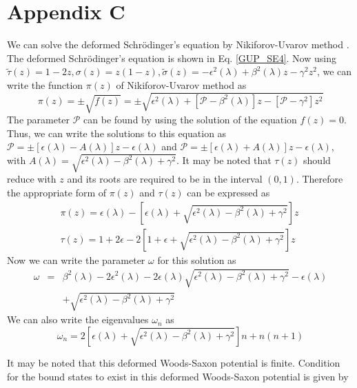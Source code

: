 \documentclass[12pt]{article}
\begin{document}
\section*{Appendix C}
We can solve the  deformed Schr\"{o}dinger's equation   by   Nikiforov-Uvarov method \cite{nu12, nu14}.  The deformed  Schr\"{o}dinger's equation is shown in Eq. \eqref{GUP_SE4}.
Now using  $
	\tilde{\tau}(z) = 1-2z, \sigma(z) = z(1-z),  \tilde{\sigma}(z) = -\epsilon^2(\lambda) + \beta^2(\lambda) z  - \gamma^2 z^2 $, we can write 
the  function $\pi(z)$ of   Nikiforov-Uvarov method as \cite{nu12, nu14} 
\begin{equation}
	\pi(z) =\pm \sqrt{f(z)} = \pm \sqrt{\epsilon^2(\lambda)  + [\mathcal{P} - \beta^2(\lambda)]z  - [\mathcal{P} - \gamma^2]z^2} 
\end{equation}
The parameter $\mathcal{P}$ can be found by using the solution of the equation  $f(z) =0$. 
Thus, we can write the  solutions to this equation as $	 \mathcal{P} =  \pm [ \epsilon(\lambda) -  A(\lambda)] z - \epsilon(\lambda)$ and  $	\mathcal{P} =   \pm [ \epsilon(\lambda) + A(\lambda)  ] z - \epsilon(\lambda)$, with $A(\lambda) = \sqrt{\epsilon^2 (\lambda)- \beta^2(\lambda) +\gamma^2} $. 
It may be noted that  $\tau(z)$ should reduce with $z$  and its roots are required to be in the interval $(0,1)$. Therefore the appropriate form  of $\pi(z)$ and $\tau(z)$ can be expressed as 
\begin{align}
\pi(z)=\epsilon(\lambda)-\left[\epsilon(\lambda)+\sqrt{\epsilon^2(\lambda)-\beta^2(\lambda)+\gamma^2}\right]z ~\label{pi_sol}
\\
\tau(z)=1+2\epsilon-2\left[1+\epsilon+\sqrt{\epsilon^2(\lambda)-\beta^2(\lambda)+\gamma^2}\right]z  ~\label{tau_sol}
\end{align}
Now  we can write the parameter $\omega$ for this solution as   
\begin{eqnarray}\label{omega_sol}
	\omega &=&\beta^2(\lambda)-2\epsilon^2(\lambda)-2\epsilon(\lambda)\sqrt{\epsilon^2(\lambda)-\beta^2(\lambda)+\gamma^2}-\epsilon(\lambda)\nonumber \\ && +\sqrt{\epsilon^2(\lambda)-\beta^2(\lambda)+\gamma^2} 
\end{eqnarray}
We can also  write the eigenvalues  $\omega_n$ as 
\begin{equation} \label{omega_n_sol}
	\omega_n =2\left[\epsilon(\lambda)+\sqrt{\epsilon^2(\lambda)-\beta^2(\lambda)+\gamma^2}\right]n+n(n+1)
\end{equation}

It may be noted that this deformed  Woods-Saxon  potential is finite.  Condition for the bound states to exist in this deformed Woods-Saxon potential is given by 
\end{document}
